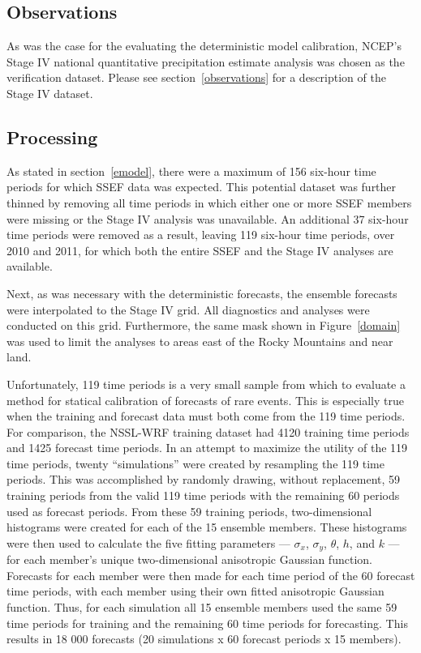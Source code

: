 \subsection{Observations}
\label{eobservations}

As was the case for the evaluating the deterministic model calibration, NCEP's Stage IV national quantitative precipitation estimate analysis was chosen as the verification dataset.
Please see \mbox{section \ref{observations}} for a description of the Stage IV dataset.




\subsection{Processing}
\label{eprocessing}

As stated in \mbox{section \ref{emodel}}, there were a maximum of 156 six-hour time periods for which SSEF data was expected.
This potential dataset was further thinned by removing all time periods in which either one or more SSEF members were missing or the Stage IV analysis was unavailable.
An additional 37 six-hour time periods were removed as a result, leaving 119 six-hour time periods, over 2010 and 2011, for which both the entire SSEF and the Stage IV analyses are available.


Next, as was necessary with the deterministic forecasts, the ensemble forecasts were interpolated to the Stage IV grid.
All diagnostics and analyses were conducted on this grid.
Furthermore, the same mask shown in \mbox{Figure \ref{domain}} was used to limit the analyses to areas east of the Rocky Mountains and near land.


Unfortunately, 119 time periods is a very small sample from which to evaluate a method for statical calibration of forecasts of rare events.
This is especially true when the training and forecast data must both come from the 119 time periods.
For comparison, the NSSL-WRF training dataset had 4120 training time periods and 1425 forecast time periods.
In an attempt to maximize the utility of the 119 time periods, twenty ``simulations'' were created by resampling the 119 time periods.
This was accomplished by randomly drawing, without replacement, 59 training periods from the valid 119 time periods with the remaining 60 periods used as forecast periods.
From these 59 training periods, two-dimensional histograms were created for each of the 15 ensemble members.
These histograms were then used to calculate the five fitting parameters --- $\sigma_x$, $\sigma_y$, $\theta$, $h$, and $k$ --- for each member's unique two-dimensional anisotropic Gaussian function.
Forecasts for each member were then made for each time period of the 60 forecast time periods, with each member using their own fitted anisotropic Gaussian function.
Thus, for each simulation all 15 ensemble members used the same 59 time periods for training and the remaining 60 time periods for forecasting.
This results in 18 000 forecasts (20 simulations x 60 forecast periods x 15 members).






